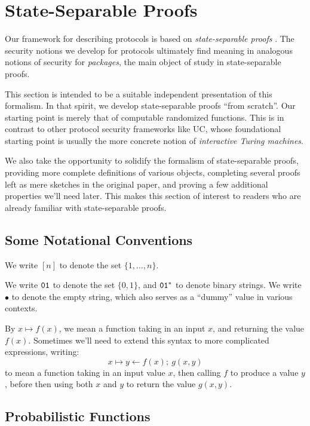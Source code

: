 \section{State-Separable Proofs}

Our framework for describing protocols is based on 
\emph{state-separable proofs}
\cite{AC:BDFKK18}.
The security notions we develop for protocols ultimately
find meaning in analogous notions of security for \emph{packages},
the main object of study in state-separable proofs.

This section is intended to be a suitable independent presentation
of this formalism.
In that spirit, we develop state-separable proofs ``from scratch''.
Our starting point is merely that of computable randomized functions.
This is in contrast to other protocol security frameworks like UC,
whose foundational starting point is usually the more concrete notion
of \emph{interactive Turing machines}.

We also take the opportunity to solidify the formalism of state-separable
proofs, providing more complete definitions of various objects,
completing several proofs left as mere sketches in the original paper,
and proving a few additional properties we'll need later.
This makes this section of interest to readers who are already familiar
with state-separable proofs.

\subsection{Some Notational Conventions}

We write $[n]$ to denote the set $\{1, \ldots, n\}$.

We write $\texttt{01}$ to denote the set $\{0, 1\}$,
and $\texttt{01}^*$ to denote binary strings.
We write $\bullet$ to denote the empty string,
which also serves as a ``dummy'' value in various contexts.

By $x \mapsto f(x)$, we mean a function taking in an input
$x$, and returning the value $f(x)$.
Sometimes we'll need to extend this syntax to more complicated expressions,
writing:
$$
x \mapsto y \gets f(x);\ g(x, y)
$$
to mean a function taking in an input value $x$,
then calling $f$ to produce a value $y$, before then using
both $x$ and $y$ to return the value $g(x, y)$.

\subsection{Probabilistic Functions}

